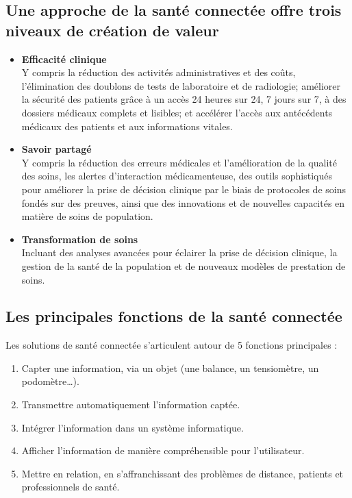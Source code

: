 \documentclass[12pt]{article}
\begin{document}
\subsection{Une approche de la santé connectée offre trois niveaux de création de valeur}
\begin{itemize}
	\item \textbf{Efficacité clinique}\\
	Y compris la réduction des activités administratives et des coûts, l’élimination des doublons de tests de laboratoire et de radiologie; améliorer la sécurité des patients grâce à un accès 24 heures sur 24, 7 jours sur 7, à des dossiers médicaux complets et lisibles; et accélérer l'accès aux antécédents médicaux des patients et aux informations vitales.
	\item \textbf{Savoir partagé}\\
	Y compris la réduction des erreurs médicales et l'amélioration de la qualité des soins, les alertes d'interaction médicamenteuse, des outils sophistiqués pour améliorer la prise de décision clinique par le biais de protocoles de soins fondés sur des preuves, ainsi que des innovations et de nouvelles capacités en matière de soins de population.
	\item \textbf{Transformation de soins}\\
	Incluant des analyses avancées pour éclairer la prise de décision clinique, la gestion de la santé de la population et de nouveaux modèles de prestation de soins.
\end{itemize}
\newpage
\subsection{Les principales fonctions de la santé connectée}
Les solutions de santé connectée s’articulent autour de 5 fonctions principales :
\begin{enumerate}
	\item Capter une information, via un objet (une balance, un tensiomètre, un podomètre…).
	\item Transmettre automatiquement l’information captée.
	\item Intégrer l’information dans un système informatique.
	\item Afficher l’information de manière compréhensible pour l’utilisateur.
	\item Mettre en relation, en s’affranchissant des problèmes de distance, patients et professionnels de santé.
\end{enumerate}
\end{document}
